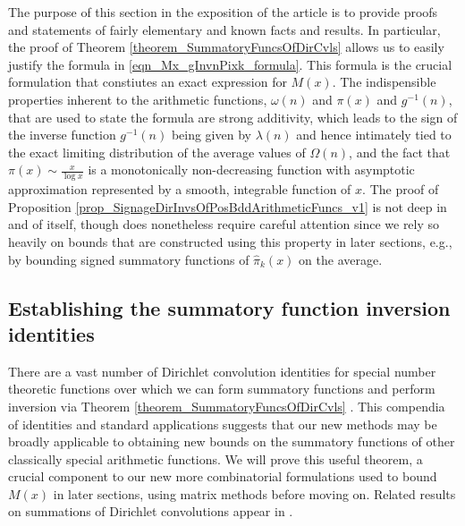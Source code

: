 \documentclass[11pt,reqno,a4letter]{article}
\numberwithin{figure}{section}
\numberwithin{table}{section}
\newcommand{\cf}{\textit{cf.\ }}
\theoremstyle{plain}
\numberwithin{theorem}{section}
\theoremstyle{definition}
\begin{document}
The purpose of this section in the exposition of the article is to provide proofs and statements 
of fairly elementary and known facts and results. In particular, the proof of 
Theorem \ref{theorem_SummatoryFuncsOfDirCvls} allows us to easily justify the formula in 
\eqref{eqn_Mx_gInvnPixk_formula}. 
This formula is the crucial formulation that constiutes an exact expression for $M(x)$. 
The indispensible properties inherent to the arithmetic functions, $\omega(n)$ and $\pi(x)$ and $g^{-1}(n)$, 
that are used to state the formula are strong additivity, which leads to the sign of the inverse function 
$g^{-1}(n)$ being given by $\lambda(n)$ and hence intimately tied to the exact limiting 
distribution of the average values of $\Omega(n)$, and the fact that $\pi(x) \sim \frac{x}{\log x}$ 
is a monotonically non-decreasing function with asymptotic approximation represented by a smooth, integrable 
function of $x$. 
The proof of Proposition \ref{prop_SignageDirInvsOfPosBddArithmeticFuncs_v1} 
is not deep in and of itself, though does nonetheless require careful attention since we rely so 
heavily on bounds that are constructed using this property in later sections, e.g., by bounding 
signed summatory functions of $\widehat{\pi}_k(x)$ on the average. 

\subsection{Establishing the summatory function inversion identities} 

There are a vast number of Dirichlet convolution 
identities for special number theoretic functions over which 
we can form summatory functions and perform inversion via 
Theorem \ref{theorem_SummatoryFuncsOfDirCvls} \cite{CATALOG-INTDIRSERIES,CATALOG-LAMBERTSERIES}. 
This compendia of identities and standard applications suggests that our new methods may be 
broadly applicable to obtaining new bounds on the summatory functions of other classically special 
arithmetic functions. 
We will prove this useful theorem, a crucial component to our new more combinatorial 
formulations used to bound $M(x)$ in later sections, using matrix methods before moving on. 
Related results on summations of Dirichlet convolutions appear in 
\cite[\S 2.14; \S 3.10; \S 3.12; \cf \S 4.9, p.\ 95]{APOSTOLANUMT}. 
\end{document}
